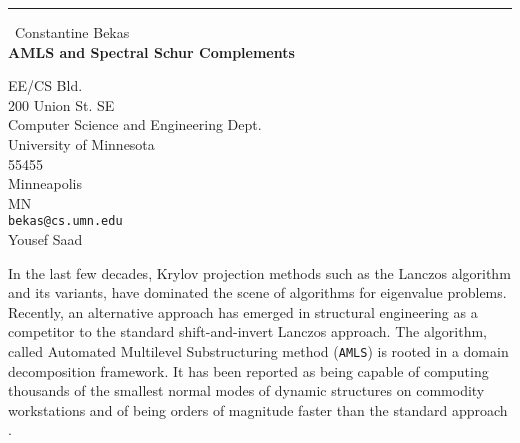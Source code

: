 \documentclass{report}
\begin{document}
\begin{center}
\rule{6in}{1pt} \
{\large Constantine Bekas \\
{\bf AMLS and Spectral Schur Complements}}

EE/CS Bld. \\ 200 Union St. SE \\ Computer Science and Engineering Dept. \\ University of Minnesota \\ 55455 \\ Minneapolis \\ MN
\\
{\tt bekas@cs.umn.edu}\\
Yousef Saad\end{center}

In the last few decades, Krylov projection methods such as the Lanczos
algorithm and its variants, have dominated the scene of algorithms for
eigenvalue problems. Recently, an alternative approach has emerged in
structural engineering as a competitor to the standard shift-and-invert
Lanczos approach. The algorithm, called Automated Multilevel
Substructuring method ({\tt AMLS}) is rooted in a domain
decomposition framework. It has been reported as being capable of
computing thousands of the smallest normal modes of dynamic structures on
commodity workstations and of being orders of magnitude faster than the
standard approach
\cite{kropp.heiserer.02}.
\end{document}

